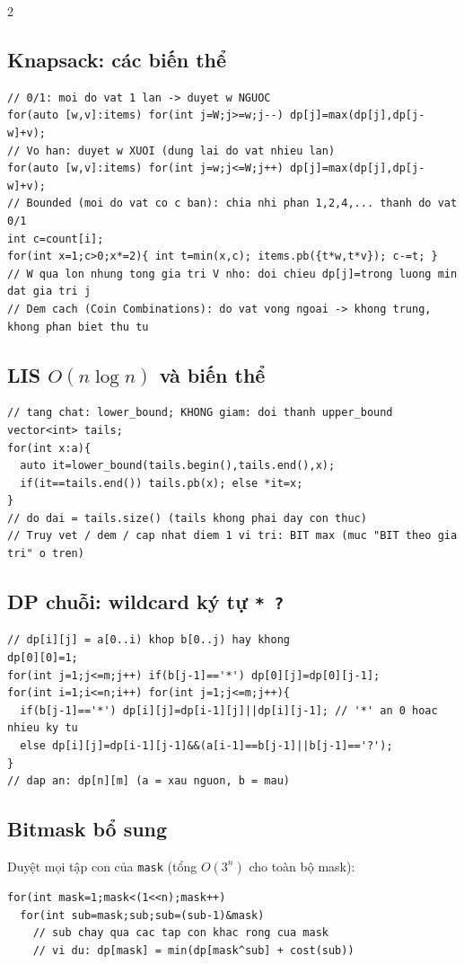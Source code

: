 \documentclass[8pt]{extarticle}
\begin{document}
\begin{multicols}{2}
\subsection{Knapsack: các biến thể}
\begin{lstlisting}
// 0/1: moi do vat 1 lan -> duyet w NGUOC
for(auto [w,v]:items) for(int j=W;j>=w;j--) dp[j]=max(dp[j],dp[j-w]+v);
// Vo han: duyet w XUOI (dung lai do vat nhieu lan)
for(auto [w,v]:items) for(int j=w;j<=W;j++) dp[j]=max(dp[j],dp[j-w]+v);
// Bounded (moi do vat co c ban): chia nhi phan 1,2,4,... thanh do vat 0/1
int c=count[i];
for(int x=1;c>0;x*=2){ int t=min(x,c); items.pb({t*w,t*v}); c-=t; }
// W qua lon nhung tong gia tri V nho: doi chieu dp[j]=trong luong min dat gia tri j
// Dem cach (Coin Combinations): do vat vong ngoai -> khong trung, khong phan biet thu tu
\end{lstlisting}

\subsection{LIS $O(n\log n)$ và biến thể}
\begin{lstlisting}
// tang chat: lower_bound; KHONG giam: doi thanh upper_bound
vector<int> tails;
for(int x:a){
  auto it=lower_bound(tails.begin(),tails.end(),x);
  if(it==tails.end()) tails.pb(x); else *it=x;
}
// do dai = tails.size() (tails khong phai day con thuc)
// Truy vet / dem / cap nhat diem 1 vi tri: BIT max (muc "BIT theo gia tri" o tren)
\end{lstlisting}

\subsection{DP chuỗi: wildcard ký tự \texttt{* ?}}
\begin{lstlisting}
// dp[i][j] = a[0..i) khop b[0..j) hay khong
dp[0][0]=1;
for(int j=1;j<=m;j++) if(b[j-1]=='*') dp[0][j]=dp[0][j-1];
for(int i=1;i<=n;i++) for(int j=1;j<=m;j++){
  if(b[j-1]=='*') dp[i][j]=dp[i-1][j]||dp[i][j-1]; // '*' an 0 hoac nhieu ky tu
  else dp[i][j]=dp[i-1][j-1]&&(a[i-1]==b[j-1]||b[j-1]=='?');
}
// dap an: dp[n][m] (a = xau nguon, b = mau)
\end{lstlisting}

\subsection{Bitmask bổ sung}
Duyệt mọi tập con của \texttt{mask} (tổng $O(3^n)$ cho toàn bộ mask):
\begin{lstlisting}
for(int mask=1;mask<(1<<n);mask++)
  for(int sub=mask;sub;sub=(sub-1)&mask)
    // sub chay qua cac tap con khac rong cua mask
    // vi du: dp[mask] = min(dp[mask^sub] + cost(sub))
\end{lstlisting}


\end{multicols}
\end{document}
